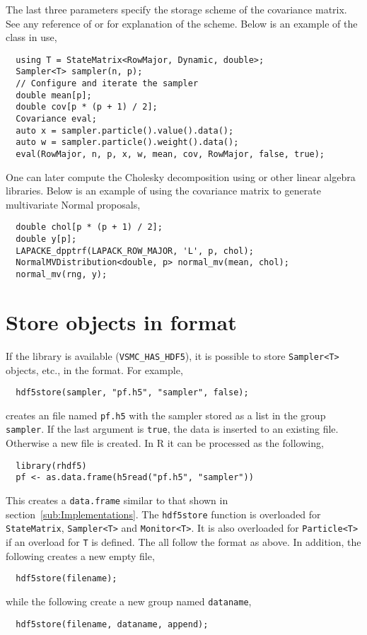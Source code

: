The last three parameters specify the storage scheme of the covariance matrix.
See any reference of \blas or \lapack for explanation of the scheme. Below is
an example of the class in use,
\begin{Verbatim}
  using T = StateMatrix<RowMajor, Dynamic, double>;
  Sampler<T> sampler(n, p);
  // Configure and iterate the sampler
  double mean[p];
  double cov[p * (p + 1) / 2];
  Covariance eval;
  auto x = sampler.particle().value().data();
  auto w = sampler.particle().weight().data();
  eval(RowMajor, n, p, x, w, mean, cov, RowMajor, false, true);
\end{Verbatim}
One can later compute the Cholesky decomposition using \lapack or other linear
algebra libraries. Below is an example of using the covariance matrix to
generate multivariate Normal proposals,
\begin{Verbatim}
  double chol[p * (p + 1) / 2];
  double y[p];
  LAPACKE_dpptrf(LAPACK_ROW_MAJOR, 'L', p, chol);
  NormalMVDistribution<double, p> normal_mv(mean, chol);
  normal_mv(rng, y);
\end{Verbatim}

\section{Store objects in \protect{} format}
\label{sec:Store objects in HDF5 format}

If the \hdf library is available (\verb|VSMC_HAS_HDF5|), it is possible to
store \verb|Sampler<T>| objects, etc., in the \hdf format. For example,
\begin{Verbatim}
  hdf5store(sampler, "pf.h5", "sampler", false);
\end{Verbatim}
creates an \hdf file named \verb|pf.h5| with the sampler stored as a list in
the group \verb|sampler|. If the last argument is \verb|true|, the data is
inserted to an existing file. Otherwise a new file is created. In R it can be
processed as the following,
\begin{Verbatim}
  library(rhdf5)
  pf <- as.data.frame(h5read("pf.h5", "sampler"))
\end{Verbatim}
This creates a \verb|data.frame| similar to that shown in
section~\ref{sub:Implementations}. The \verb|hdf5store| function is overloaded
for \verb|StateMatrix|, \verb|Sampler<T>| and \verb|Monitor<T>|. It is also
overloaded for \verb|Particle<T>| if an overload for \verb|T| is defined. The
all follow the format as above. In addition, the following creates a new empty
\hdf file,
\begin{Verbatim}
  hdf5store(filename);
\end{Verbatim}
while the following create a new group named \verb|dataname|,
\begin{Verbatim}
  hdf5store(filename, dataname, append);
\end{Verbatim}

